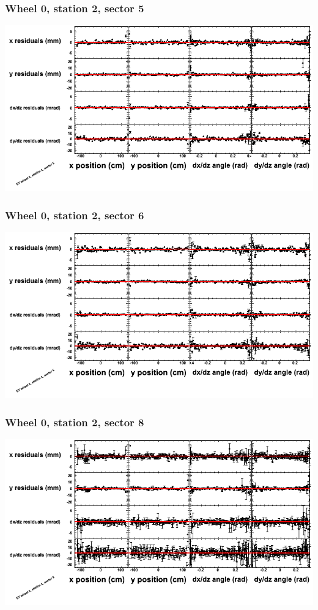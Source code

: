 \documentclass[compress]{beamer}
\begin{document}
\begin{frame}
\frametitle{Wheel 0, station 2, sector 5}
\includegraphics[width=\linewidth]{tmppoly_MBwhCst2sec05.png}
\end{frame}

\begin{frame}
\frametitle{Wheel 0, station 2, sector 6}
\includegraphics[width=\linewidth]{tmppoly_MBwhCst2sec06.png}
\end{frame}

\begin{frame}
\frametitle{Wheel 0, station 2, sector 8}
\includegraphics[width=\linewidth]{tmppoly_MBwhCst2sec08.png}
\end{frame}
\end{document}
